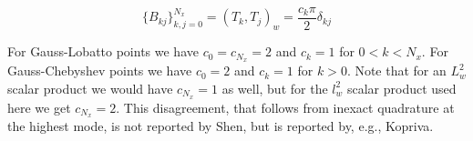 \documentclass[11pt, oneside]{article}
\begin{document}
\begin{equation}
 \{B_{kj}\}_{k,j=0}^{N_x} = (T_k, T_j)_w = \frac{c_k \pi}{2} \delta_{kj}
\end{equation}



For Gauss-Lobatto points we have $c_0=c_{N_x}=2$ and $c_k=1$ for $0<k<N_x$. For Gauss-Chebyshev points we have $c_0=2$ and $c_k=1$ for $k>0$. Note that for an $L^2_w$ scalar product we would have $c_{N_x}=1$ as well, but for the $l^2_w$ scalar product used here we get $c_{N_x}=2$. This disagreement, that follows from inexact quadrature at the highest mode, is not reported by Shen, but is reported by, e.g., Kopriva.



\end{document}
